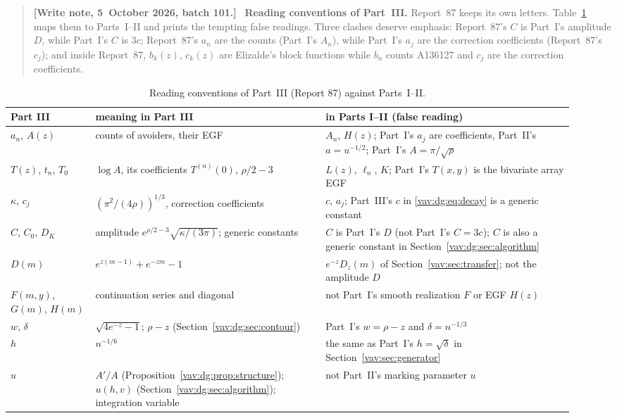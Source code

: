 \documentclass[11pt]{article}
\theoremstyle{remark}\newtheorem{remark}[theorem]{Remark}
\newenvironment{writenoteb}{\begin{quote}\small\raggedright\textbf{[Write note, 5~October 2026, batch 101.]}\ }{\end{quote}}
\begin{document}
\begin{writenoteb}
\textbf{Reading conventions of Part~III.} Report~87 keeps its own letters.
Table~\ref{vav:dg:tab:notation} maps them to Parts~I--II and prints the
tempting false readings. Three clashes deserve emphasis: Report~87's $C$
is Part~I's amplitude $D$, while Part~I's $C$ is $3c$; Report~87's $a_n$
are the counts (Part~I's $A_n$), while Part~I's $a_j$ are the correction
coefficients (Report~87's $c_j$); and inside Report~87, $b_k(z)$, $c_k(z)$
are Elizalde's block functions while $b_n$ counts A136127 and $c_j$ are the
correction coefficients.
\end{writenoteb}
\begin{table}[H]
\centering\small
\caption{Reading conventions of Part~III (Report 87) against Parts~I--II.}
\label{vav:dg:tab:notation}
\begin{tabular}{@{}>{\raggedright}p{0.14\linewidth}>{\raggedright}p{0.38\linewidth}>{\raggedright\arraybackslash}p{0.41\linewidth}@{}}
\toprule
Part III & meaning in Part III & in Parts I--II (false reading)\\\midrule
$a_n$, $A(z)$ & counts of avoiders, their EGF & $A_n$, $H(z)$; Part~I's $a_j$ are coefficients, Part~II's $a=u^{-1/2}$; Part~I's $A=\pi/\sqrt\rho$\\
$T(z)$, $t_n$, $T_0$ & $\log A$, its coefficients $T^{(n)}(0)$, $\rho/2-3$ & $L(z)$, $\ell_n$, $K$; Part~I's $T(x,y)$ is the bivariate array EGF\\
$\kappa$, $c_j$ & $(\pi^2/(4\rho))^{1/3}$, correction coefficients & $c$, $a_j$; Part~III's $c$ in \eqref{vav:dg:eq:decay} is a generic constant\\
$C$, $C_0$, $D_K$ & amplitude $e^{\rho/2-3}\sqrt{\kappa/(3\pi)}$; generic constants & $C$ is Part~I's $D$ (not Part~I's $C=3c$); $C$ is also a generic constant in Section~\ref{vav:dg:sec:algorithm}\\
$D(m)$ & $e^{z(m-1)}+e^{-zm}-1$ & $e^{-z}D_z(m)$ of Section~\ref{vav:sec:transfer}; not the amplitude $D$\\
$F(m,y)$, $G(m)$, $H(m)$ & continuation series and diagonal & not Part~I's smooth realization $F$ or EGF $H(z)$\\
$w$, $\delta$ & $\sqrt{4e^{-z}-1}$; $\rho-z$ (Section~\ref{vav:dg:sec:contour}) & Part~I's $w=\rho-z$ and $\delta=n^{-1/3}$\\
$h$ & $n^{-1/6}$ & the same as Part~I's $h=\sqrt\delta$ in Section~\ref{vav:sec:generator}\\
$u$ & $A'/A$ (Proposition~\ref{vav:dg:prop:structure}); $u(h,v)$ (Section~\ref{vav:dg:sec:algorithm}); integration variable & not Part~II's marking parameter $u$\\

\end{tabular}
\end{table}
\end{document}
